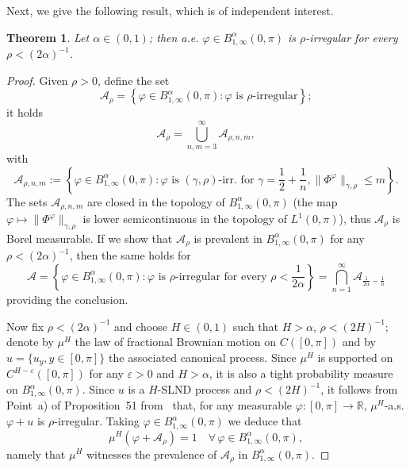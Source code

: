 \documentclass[11pt,oneside,reqno]{amsart}
\newcommand{\assign}{:=}
\newtheorem{theorem}{Theorem}[section]
\numberwithin{equation}{section}
\begin{document}
Next, we give the following result, which is of independent interest.

\begin{theorem}
  \label{thm:prevalence-interval-inviscid}Let $\alpha \in (0, 1)$; then a.e.
  $\varphi \in B^{\alpha}_{1, \infty} (0, \pi)$ is $\rho$-irregular for every
  $\rho < (2 \alpha)^{- 1}$.
\end{theorem}

\begin{proof}
  Given $\rho > 0$, define the set
  \[ \mathcal{A}_{\rho} = \left\{ \varphi \in B^{\alpha}_{1, \infty} (0, \pi)
     : \varphi \text{ is $\rho$-irregular} \right\} ; \]
  it holds
  \[ \mathcal{A}_{\rho} = \bigcup_{n, m = 3}^{\infty} \mathcal{A}_{\rho, n,
     m}, \]
  with
  \[ \mathcal{A}_{\rho, n, m} \assign \left\{ \varphi \in B^{\alpha}_{1,
     \infty} (0, \pi) : \varphi \text{ is $(\gamma, \rho)$-irr. for } \gamma =
     \frac{1}{2} + \frac{1}{n}, \| \Phi^{\varphi} \|_{\gamma, \rho} \leqslant
     m  \right\} . \]
  The sets $\mathcal{A}_{\rho, n, m}$ are closed in the topology of
  $B^{\alpha}_{1, \infty} (0, \pi)$ (the map $\varphi \mapsto \|
  \Phi^{\varphi} \|_{\gamma, \rho}$ is lower semicontinuous in the topology of
  $L^1 (0, \pi)$), thus $\mathcal{A}_{\rho}$ is Borel measurable. If we show
  that $\mathcal{A}_{\rho}$ is prevalent in $B^{\alpha}_{1, \infty} (0, \pi)$
  for any $\rho < (2 \alpha)^{- 1}$, then the same holds for
  \[ \mathcal{A} = \left\{ \varphi \in B^{\alpha}_{1, \infty} (0, \pi) :
     \varphi \text{ is $\rho$-irregular for every } \rho < \frac{1}{2 \alpha}
     \right\} = \bigcap_{n = 1}^{\infty} \mathcal{A}_{\frac{1}{2 \alpha} -
     \frac{1}{n}} \]
  providing the conclusion.
  
  Now fix $\rho < (2 \alpha)^{- 1}$ and choose $H \in (0, 1)$ such that $H >
  \alpha$, $\rho < (2 H)^{- 1}$; denote by $\mu^H$ the law of fractional
  Brownian motion on $C ([0, \pi])$ and by $u = \{ u_y, y \in [0, \pi] \}$ the
  associated canonical process. Since $\mu^H$ is supported on $C^{H -
  \varepsilon} ([0, \pi])$ for any $\varepsilon > 0$ and $H > \alpha$, it is
  also a tight probability measure on $B^{\alpha}_{1, \infty} (0, \pi)$. Since
  $u$ is a $H$-SLND process and $\rho < (2 H)^{- 1}$, it follows from Point~a)
  of Proposition~51 from~{\cite{galeati2020prevalence}} that, for any
  measurable $\varphi : [0, \pi] \rightarrow \mathbb{R}$, $\mu^H$-a.s.
  $\varphi + u$ is $\rho$-irregular. Taking $\varphi \in B^{\alpha}_{1,
  \infty} (0, \pi)$ we deduce that
  \[ \mu^H (\varphi + \mathcal{A}_{\rho}) = 1 \quad \forall \, \varphi \in
     B^{\alpha}_{1, \infty} (0, \pi), \]
  namely that $\mu^H$ witnesses the prevalence of $\mathcal{A}_{\rho}$ in
  $B^{\alpha}_{1, \infty} (0, \pi)$.
\end{proof}
\end{document}
